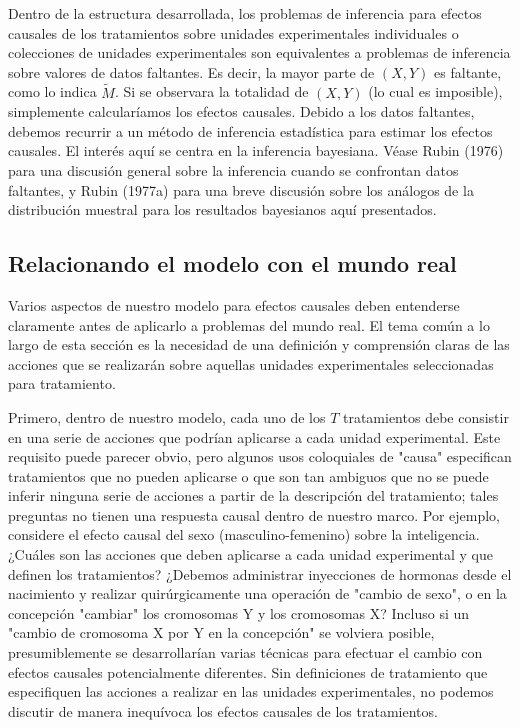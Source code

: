 \documentclass[12pt,a4paper]{article}
\begin{document}
Dentro de la estructura desarrollada, los problemas de inferencia para efectos causales de los tratamientos sobre unidades experimentales individuales o colecciones de unidades experimentales son equivalentes a problemas de inferencia sobre valores de datos faltantes. Es decir, la mayor parte de $(X, Y)$ es faltante, como lo indica $\tilde{M}$. Si se observara la totalidad de $(X, Y)$ (lo cual es imposible), simplemente calcularíamos los efectos causales. Debido a los datos faltantes, debemos recurrir a un método de inferencia estadística para estimar los efectos causales. El interés aquí se centra en la inferencia bayesiana. Véase Rubin (1976) para una discusión general sobre la inferencia cuando se confrontan datos faltantes, y Rubin (1977a) para una breve discusión sobre los análogos de la distribución muestral para los resultados bayesianos aquí presentados.

\subsection{Relacionando el modelo con el mundo real}

Varios aspectos de nuestro modelo para efectos causales deben entenderse claramente antes de aplicarlo a problemas del mundo real. El tema común a lo largo de esta sección es la necesidad de una definición y comprensión claras de las acciones que se realizarán sobre aquellas unidades experimentales seleccionadas para tratamiento. 

Primero, dentro de nuestro modelo, cada uno de los $T$ tratamientos debe consistir en una serie de acciones que podrían aplicarse a cada unidad experimental.  Este requisito puede parecer obvio, pero algunos usos coloquiales de "causa" especifican tratamientos que no pueden aplicarse o que son tan ambiguos que no se puede inferir ninguna serie de acciones a partir de la descripción del tratamiento; tales preguntas no tienen una respuesta causal dentro de nuestro marco. Por ejemplo, considere el efecto causal del sexo (masculino-femenino) sobre la inteligencia. ¿Cuáles son las acciones que deben aplicarse a cada unidad experimental y que definen los tratamientos?  ¿Debemos administrar inyecciones de hormonas desde el nacimiento y realizar quirúrgicamente una operación de "cambio de sexo", o en la concepción "cambiar" los cromosomas Y y los cromosomas X? Incluso si un "cambio de cromosoma X por Y en la concepción" se volviera posible, presumiblemente se desarrollarían varias técnicas para efectuar el cambio con efectos causales potencialmente diferentes. Sin definiciones de tratamiento que especifiquen las acciones a realizar en las unidades experimentales, no podemos discutir de manera inequívoca los efectos causales de los tratamientos. 
\end{document}
